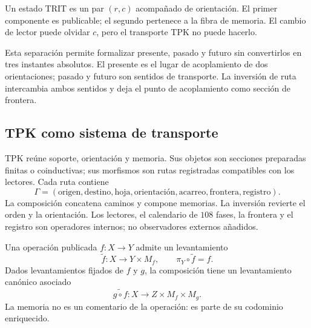 \begin{definition}
Un estado TRIT es un par \((r,c)\) acompañado de orientación. El primer
componente es publicable; el segundo pertenece a la fibra de memoria. El
cambio de lector puede olvidar \(c\), pero el transporte TPK no puede hacerlo.
\end{definition}

Esta separación permite formalizar presente, pasado y futuro sin convertirlos
en tres instantes absolutos. El presente es el lugar de acoplamiento de dos
orientaciones; pasado y futuro son sentidos de transporte. La inversión de
ruta intercambia ambos sentidos y deja el punto de acoplamiento como sección
de frontera.

\subsection{TPK como sistema de transporte}

TPK reúne soporte, orientación y memoria. Sus objetos son secciones preparadas
finitas o coinductivas; sus morfismos son rutas registradas compatibles con los
lectores. Cada ruta contiene
\[
\Gamma=(\text{origen},\text{destino},\text{hoja},\text{orientación},
\text{acarreo},\text{frontera},\text{registro}).
\]
La composición concatena caminos y compone memorias. La inversión revierte el
orden y la orientación. Los lectores, el calendario de \(108\) fases, la frontera y el
registro son operadores internos; no observadores externos añadidos.

Una operación publicada \(f:X\to Y\) admite un levantamiento
\[
 \widetilde f:X\longrightarrow Y\times M_f,
 \qquad \pi_Y\circ\widetilde f=f.
\]
Dados levantamientos fijados de \(f\) y \(g\), la composición tiene un
levantamiento canónico asociado
\[
 \widetilde{g\circ f}:X\longrightarrow Z\times M_f\times M_g.
\]
La memoria no es un comentario de la operación: es parte de su codominio
enriquecido.

